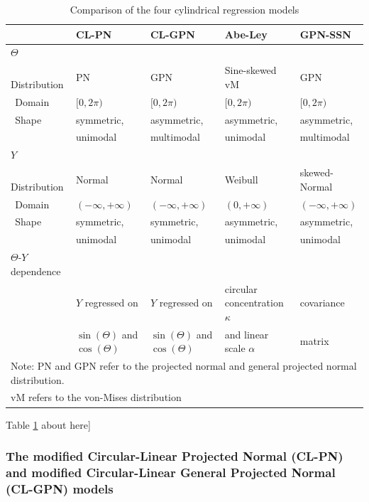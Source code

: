 \documentclass[man,mask]{apa6}
\begin{document}
\begin{table}
\centering
\caption{Comparison of the four cylindrical regression models} 
\begin{tabular}{lllll}
  \noalign{\smallskip}\hline\noalign{\smallskip}
\multicolumn{1}{l}{Aspect} & CL-PN & CL-GPN  & Abe-Ley  & GPN-SSN \\ \hline\noalign{\smallskip}
$\Theta$ & &&&\\
$\:\:$Distribution& PN & GPN & Sine-skewed vM & GPN\\
$\:\:$Domain & $[0, 2\pi)$ & $[0, 2\pi)$ & $[0, 2\pi)$ & $[0, 2\pi)$\\
$\:\:$Shape & symmetric, & asymmetric, & asymmetric, & asymmetric, \\
            & unimodal  & multimodal & unimodal   & multimodal \\\hline\noalign{\smallskip}
$Y$& &&&\\
$\:\:$Distribution & Normal & Normal & Weibull & skewed-Normal\\
$\:\:$Domain & $(-\infty, + \infty)$ & $(-\infty, + \infty)$ & $(0, + \infty)$ & $(-\infty, + \infty)$\\
$\:\:$Shape & symmetric, & symmetric, & asymmetric, & asymmetric, \\
            & unimodal  & unimodal  & unimodal   & unimodal\\\hline\noalign{\smallskip}
$\Theta$-$Y$ dependence &                                   &                                   & & \\
                        & $Y$ regressed on                  & $Y$ regressed on                  & circular concentration $\kappa$  & covariance \\
                        & $\sin(\Theta)$ and $\cos(\Theta)$ & $\sin(\Theta)$ and $\cos(\Theta)$ & and linear scale $\alpha$ & matrix\\\hline
\multicolumn{5}{l}{Note: PN and GPN refer to the projected normal and general projected normal distribution.}\\
\multicolumn{5}{l}{vM refers to the von-Mises distribution}\\

\end{tabular}
\label{TableModels}
\end{table}

\hfil \hspace{2cm}{[}Table \ref{TableModels} about here{]} \hfil

\subsubsection{The modified Circular-Linear Projected Normal (CL-PN) and modified Circular-Linear General Projected Normal (CL-GPN) models}\label{CL-(G)PN}
\end{document}
